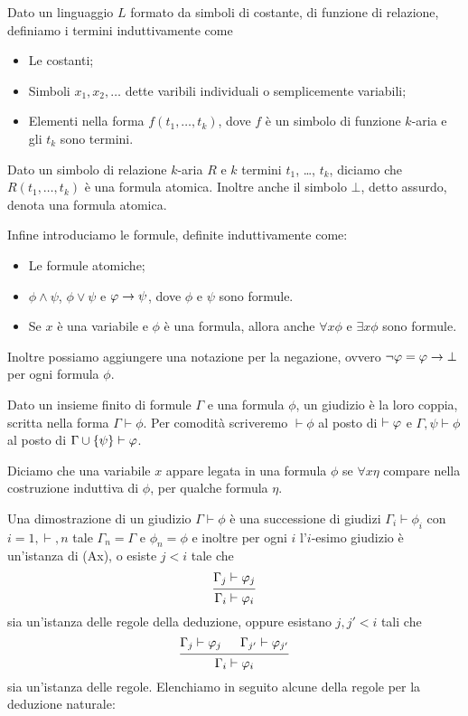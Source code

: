 \documentclass[]{marticle}
\begin{document}
\begin{block}[Definizione]
    Dato un linguaggio $L$ formato da simboli di costante, di funzione di
    relazione, definiamo i termini induttivamente come 
    \begin{itemize}
        \item Le costanti;
        \item Simboli $x_1, x_2,\dots$ dette varibili individuali o
            semplicemente variabili;
        \item Elementi nella forma $f(t_1, \dots, t_k)$, dove $f$ \`e un simbolo
            di funzione $k$-aria e gli $t_k$ sono termini.
    \end{itemize}

    Dato un simbolo di relazione $k$-aria $R$ e $k$ termini $t_1$, \dots, $t_k$,
    diciamo che $R(t_1, \dots, t_k)$ \`e una formula atomica. Inoltre anche il
    simbolo $\bot$, detto assurdo, denota una formula atomica.

    Infine introduciamo le formule, definite induttivamente come:
    \begin{itemize}
        \item Le formule atomiche;
        \item $\phi \land \psi$, $\phi \lor \psi$ e $\varphi \rightarrow \psi$, dove
            $\phi$ e $\psi$ sono formule.
        \item Se $x$ \`e una variabile e $\phi$ \`e una formula, allora anche
            $\forall x \phi$ e $\exists x \phi$ sono formule.
    \end{itemize}
    Inoltre possiamo aggiungere una notazione per la negazione, ovvero $\lnot
    \varphi = \varphi\rightarrow\bot$ per ogni formula $\phi$.

    Dato un insieme finito di formule $\Gamma$ e una formula $\phi$, un giudizio
    \`e la loro coppia, scritta nella forma $\Gamma\vdash \phi$. Per comodit\`a
    scriveremo $\vdash \phi $ al posto di $\empty \vdash \phi$ e $\Gamma ,\psi
    \vdash \phi$ al posto di $\Gamma \cup \{\psi\} \vdash \varphi$.

    Diciamo che una variabile $x$ appare legata in una formula $\phi$ se
    $\forall x\eta$ compare nella costruzione induttiva di $\phi$, per qualche
    formula $\eta$.

    Una dimostrazione di un giudizio $\Gamma\vdash \phi$ \`e una successione di
    giudizi $\Gamma_i\vdash \phi_i$ con $i=1,\vdash,n$ tale $\Gamma_n=\Gamma$ e
    $\phi_n=\phi$ e inoltre per ogni $i$ l'$i$-esimo giudizio \`e un'istanza di
    (Ax), o esiste $j<i$ tale che
    \[
        \begin{prooftree}
            \hypo{\Gamma_j\vdash\phi_j}
            \infer1{\Gamma_i\vdash\phi_i}
        \end{prooftree}
    \]
    sia un'istanza delle regole della deduzione, oppure esistano $j, j' <i$ tali
    che
    \[
        \begin{prooftree}
            \hypo{\Gamma_j\vdash\phi_j}
            \hypo{\Gamma_{j'}\vdash\phi_{j'}}
            \infer2{\Gamma_i\vdash\phi_i}
        \end{prooftree}
    \]
    sia un'istanza delle regole. Elenchiamo in seguito alcune della regole per
    la deduzione naturale:


\end{block}
\end{document}
